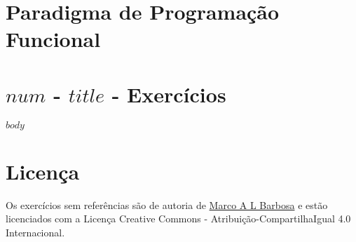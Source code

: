 \documentclass[a4paper,11pt]{article}
\begin{document}
\pagestyle{empty}

\section{Paradigma de Programação Funcional}

\section{$num$ - $title$ - Exercícios}

$body$

\section{Licença}

\begin{center}
Os exercícios sem referências são de autoria de \href{malbarbo.pro.br}{Marco A
L Barbosa} e estão licenciados com a Licença Creative Commons -
Atribuição-CompartilhaIgual 4.0 Internacional.

\href{http://cieativecommons.org/licenses/by-sa/4.0/}{\ccbysa}
\end{center}
\end{document}
